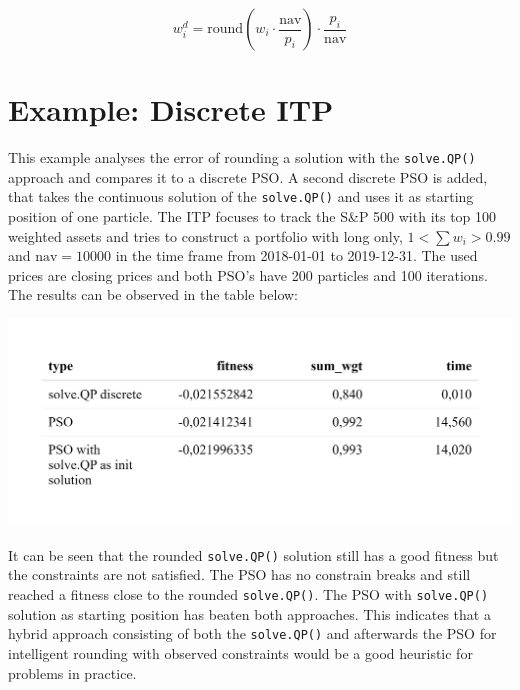 \documentclass[
  oneside]{book}
\begin{document}
\[
  w_i^d =\text{round}(w_i \cdot \frac{\text{nav}}{p_i})\cdot \frac{p_i}{\text{nav}}
\]

\hypertarget{example-discrete-itp}{%
\section{Example: Discrete ITP}\label{example-discrete-itp}}

This example analyses the error of rounding a solution with the \texttt{solve.QP()} approach and compares it to a discrete PSO. A second discrete PSO is added, that takes the continuous solution of the \texttt{solve.QP()} and uses it as starting position of one particle. The ITP focuses to track the S\&P 500 with its top 100 weighted assets and tries to construct a portfolio with long only, \(1 < \textstyle\sum w_i > 0.99\) and \(\text{nav} = 10000\) in the time frame from 2018-01-01 to 2019-12-31. The used prices are closing prices and both PSO's have 200 particles and 100 iterations. The results can be observed in the table below:

\includegraphics{Master_Thesis_files/figure-latex/pso9-1.png}

It can be seen that the rounded \texttt{solve.QP()} solution still has a good fitness but the constraints are not satisfied. The PSO has no constrain breaks and still reached a fitness close to the rounded \texttt{solve.QP()}. The PSO with \texttt{solve.QP()} solution as starting position has beaten both approaches. This indicates that a hybrid approach consisting of both the \texttt{solve.QP()} and afterwards the PSO for intelligent rounding with observed constraints would be a good heuristic for problems in practice.

  
\end{document}
